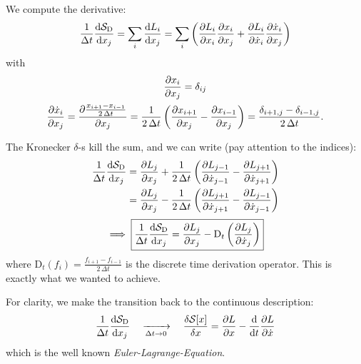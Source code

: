 \documentclass[11pt,a4paper]{scrartcl}
\newcommand{\SD}{\ensuremath{\mathcal{S}_{\mathrm{D}}}}
\newcommand{\xdoti}{\ensuremath{\dot{x}_i}}
\newcommand{\xdotj}{\ensuremath{\dot{x}_j}}
\newcommand{\xdotjm}{\ensuremath{\dot{x}_{j-1}}}
\newcommand{\deltaij}{\ensuremath{\delta_{ij}}}
\newcommand{\OverDeltaT}[1]{\ensuremath{\frac{#1}{\Delta t}}}
\newcommand{\DT}{\ensuremath{\mathrm{D}_t}}
\newcommand{\OverTwoDeltaT}[1]{\ensuremath{\frac{#1}{2\, \Delta t}}}
\newcommand{\xdotjp}{\ensuremath{\dot{x}_{j+1}}}
\begin{document}
We compute the derivative:
\begin{equation}
    \OverDeltaT{1}\dv{\SD}{x_j} =\sum_i\dv{L_i}{x_j}
    =\sum_i\left(\pdv{L_i}{x_i}\pdv{x_i}{x_j}+\pdv{L_i}{\xdoti}\pdv{\xdoti}{x_j}\right)
\end{equation}
with
\begin{subequations}
\begin{gather}
    \pdv{x_i}{x_j}=\deltaij \\
    \pdv{\xdoti}{x_j}=\pdv{\OverTwoDeltaT{x_{i+1}-x_{i-1}}}{x_j}
    =\OverTwoDeltaT{1}\left(\pdv{x_{i+1}}{x_j}-\pdv{x_{i-1}}{x_j}\right)
    =\frac{\delta_{i+1,j}-\delta_{i-1,j}}{2\,\Delta t}.
\end{gather}
\end{subequations}

The Kronecker $\delta$-s kill the sum, and we can write (pay attention to the indices):
\begin{align*}
    \OverDeltaT{1}\dv{\SD}{x_j}&=\pdv{L_j}{x_j}+\frac{1}{2\,\Delta{t}}
    \left(\pdv{L_{j-1}}{\xdotjm}-\pdv{L_{j+1}}{\xdotjp}\right)
    \\
    &=\pdv{L_j}{x_j}-\OverTwoDeltaT{1}\left(\pdv{L_{j+1}}{\xdotjp}-\pdv{L_{j-1}}{\xdotjm}\right)
\end{align*}
\begin{equation}
    \implies\boxed{\OverDeltaT{1}\dv{\SD}{x_j}=\pdv{L_j}{x_j}-\DT\left(\pdv{L_{j}}{\xdotj}\right)}
\end{equation}
where $\DT(f_i)=\OverTwoDeltaT{f_{i+1}-f_{i-1}}$ is the discrete time derivation
operator.
This is exactly what we wanted to achieve.

For clarity, we make the transition back to the continuous description:
\begin{equation}
    \OverDeltaT{1}\dv{\SD}{x_j}
    \quad\xrightarrow[\Delta{t}\to{0}]{}\quad
    \fdv{\mathcal{S}[x]}{x}=\pdv{L}{x}-\dv{t}\pdv{L}{\dot{x}}
\end{equation}
which is the well known \emph{Euler-Lagrange-Equation}.
\end{document}
